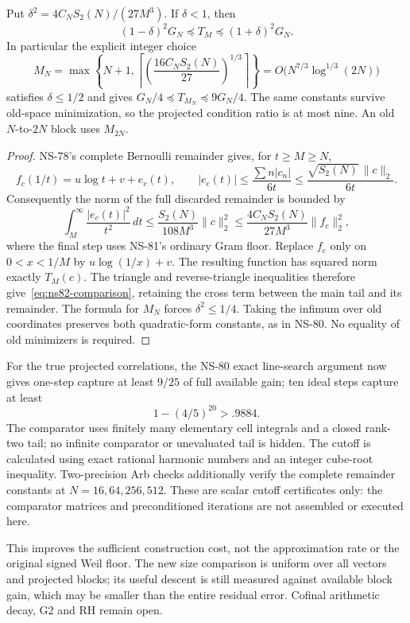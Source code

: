 \begin{proposition}
\label{prop:ns82-tail-compression}
Put $\delta^2=4C_NS_2(N)/(27M^3)$. If $\delta<1$, then
\begin{equation}
 (1-\delta)^2G_N\preceq T_M\preceq(1+\delta)^2G_N.
 \label{eq:ns82-comparison}
\end{equation}
In particular the explicit integer choice
\[
 M_N=\max\left\{N+1,
 \left\lceil\left(\frac{16C_NS_2(N)}{27}\right)^{1/3}\right\rceil\right\}
 =O\bigl(N^{7/3}\log^{1/3}(2N)\bigr)
\]
satisfies $\delta\leq1/2$ and gives
$G_N/4\preceq T_{M_N}\preceq9G_N/4$.
The same constants survive old-space minimization, so the projected
condition ratio is at most nine. An old $N$-to-$2N$ block uses $M_{2N}$.
\end{proposition}
\begin{proof}
NS-78's complete Bernoulli remainder gives, for $t\geq M\geq N$,
\[
 f_c(1/t)=u\log t+v+e_c(t),\qquad
 |e_c(t)|\leq\frac{\sum n|c_n|}{6t}
            \leq\frac{\sqrt{S_2(N)}\,\|c\|_2}{6t}.
\]
Consequently the norm of the full discarded remainder is bounded by
\[
 \int_M^\infty\frac{|e_c(t)|^2}{t^2}\,dt
 \leq\frac{S_2(N)}{108M^3}\|c\|_2^2
 \leq\frac{4C_NS_2(N)}{27M^3}\|f_c\|_2^2,
\]
where the final step uses NS-81's ordinary Gram floor. Replace $f_c$
only on $0<x<1/M$ by $u\log(1/x)+v$. The resulting function has squared
norm exactly $T_M(c)$. The triangle and reverse-triangle inequalities
therefore give~\eqref{eq:ns82-comparison}, retaining the cross term
between the main tail and its remainder. The formula for $M_N$ forces
$\delta^2\leq1/4$. Taking the infimum over old coordinates preserves
both quadratic-form constants, as in NS-80. No equality of old
minimizers is required.
\end{proof}

For the true projected correlations, the NS-80 exact line-search argument
now gives one-step capture at least $9/25$ of full available gain; ten
ideal steps capture at least
\[
 1-(4/5)^{20}>.9884.
\]
The comparator uses finitely many elementary cell integrals and a closed
rank-two tail; no infinite comparator or unevaluated tail is hidden.
The cutoff is calculated using exact rational harmonic numbers and an
integer cube-root inequality. Two-precision Arb checks additionally
verify the complete remainder constants at $N=16,64,256,512$.
These are scalar cutoff certificates only: the comparator matrices and
preconditioned iterations are not assembled or executed here.

This improves the sufficient construction cost, not the approximation
rate or the original signed Weil floor. The new size comparison is
uniform over all vectors and projected blocks; its useful descent is
still measured against available block gain, which may be smaller than
the entire residual error. Cofinal arithmetic decay, G2 and RH remain open.
